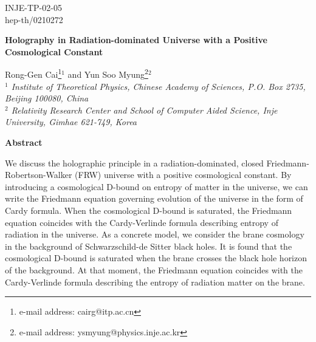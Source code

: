 \documentclass[a4paper,12pt]{article}
\begin{document}
\topmargin 0pt \oddsidemargin 0mm

\renewcommand{\thefootnote}{\fnsymbol{footnote}}
\begin{titlepage}
\begin{flushright}
INJE-TP-02-05\\
hep-th/0210272
\end{flushright}

\vspace{5mm}
\begin{center}
{\Large \bf Holography in Radiation-dominated  Universe with
a Positive Cosmological Constant} \vspace{12mm}

{\large Rong-Gen Cai\footnote{e-mail address: cairg@itp.ac.cn}$^1$
 and Yun Soo Myung\footnote{e-mail
 address: ysmyung@physics.inje.ac.kr}$^2$}
 \\
\vspace{10mm} {\em $^1$ Institute of Theoretical Physics, Chinese
Academy of Sciences, P.O. Box 2735, Beijing 100080, China \\
$^2$ Relativity Research Center and School of Computer Aided
Science, Inje University, Gimhae 621-749, Korea}
\end{center}

\vspace{5mm} \centerline{{\bf{Abstract}}}
 \vspace{5mm}
We discuss the holographic principle in a radiation-dominated,
closed Friedmann-Robertson-Walker (FRW) universe with a positive
cosmological constant. By introducing a cosmological D-bound on
entropy of matter in the universe, we can write the Friedmann equation 
governing evolution of the universe in the form of Cardy formula. When 
the cosmological D-bound is saturated, the Friedmann equation coincides 
with the Cardy-Verlinde formula describing entropy of radiation in the
universe.  As a concrete model, we consider the brane cosmology in the 
background of Schwarzschild-de Sitter black holes. It is found that the 
cosmological D-bound is saturated when the brane crosses the black hole 
horizon of the background. At that moment, the Friedmann equation
coincides with the Cardy-Verlinde formula describing the entropy
of radiation matter on the brane.



\end{titlepage}

\newpage
\renewcommand{\thefootnote}{\arabic{footnote}}
\setcounter{footnote}{0} \setcounter{page}{2}
\end{document}
